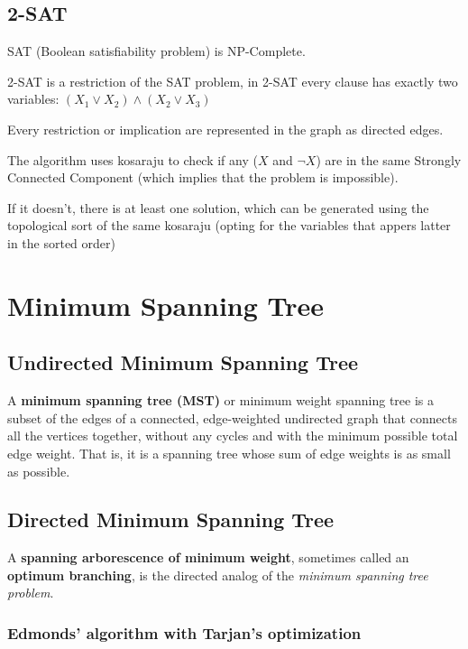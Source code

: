 
	\subsection{2-SAT}
	
		SAT (Boolean satisfiability problem) is NP-Complete.

		2-SAT is a restriction of the SAT problem, in 2-SAT every clause has exactly two variables:
		$ (X_1 \vee X_2) \wedge (X_2 \vee X_3) $

		Every restriction or implication are represented in the graph as directed edges.

		The algorithm uses kosaraju to check if any ($X$ and $\neg{X}$) are in the same Strongly Connected Component 
		(which implies that the problem is impossible). 

		If it doesn't, there is at least one solution, which can be generated using the topological sort of the same kosaraju 
		(opting for the variables that appers latter in the sorted order)


\section{Minimum Spanning Tree}

\subsection{Undirected Minimum Spanning Tree}

	A \textbf{minimum spanning tree (MST)} or minimum weight spanning tree is a subset of the edges
	of a connected, edge-weighted undirected graph that connects all the vertices together,
	without any cycles and with the minimum possible total edge weight.
	That is, it is a spanning tree whose sum of edge weights is as small as possible.


\subsection{Directed Minimum Spanning Tree}

	A \textbf{spanning arborescence of minimum weight}, sometimes called an \textbf{optimum branching},
	is the directed analog of the \textit{minimum spanning tree problem}.

	\subsubsection{Edmonds' algorithm with Tarjan's optimization}

